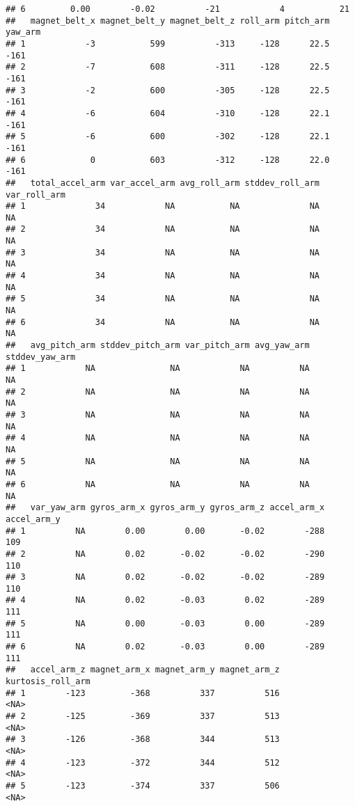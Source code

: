 \documentclass[
]{article}
\begin{document}
\begin{verbatim}
## 6         0.00        -0.02          -21            4           21
##   magnet_belt_x magnet_belt_y magnet_belt_z roll_arm pitch_arm yaw_arm
## 1            -3           599          -313     -128      22.5    -161
## 2            -7           608          -311     -128      22.5    -161
## 3            -2           600          -305     -128      22.5    -161
## 4            -6           604          -310     -128      22.1    -161
## 5            -6           600          -302     -128      22.1    -161
## 6             0           603          -312     -128      22.0    -161
##   total_accel_arm var_accel_arm avg_roll_arm stddev_roll_arm var_roll_arm
## 1              34            NA           NA              NA           NA
## 2              34            NA           NA              NA           NA
## 3              34            NA           NA              NA           NA
## 4              34            NA           NA              NA           NA
## 5              34            NA           NA              NA           NA
## 6              34            NA           NA              NA           NA
##   avg_pitch_arm stddev_pitch_arm var_pitch_arm avg_yaw_arm stddev_yaw_arm
## 1            NA               NA            NA          NA             NA
## 2            NA               NA            NA          NA             NA
## 3            NA               NA            NA          NA             NA
## 4            NA               NA            NA          NA             NA
## 5            NA               NA            NA          NA             NA
## 6            NA               NA            NA          NA             NA
##   var_yaw_arm gyros_arm_x gyros_arm_y gyros_arm_z accel_arm_x accel_arm_y
## 1          NA        0.00        0.00       -0.02        -288         109
## 2          NA        0.02       -0.02       -0.02        -290         110
## 3          NA        0.02       -0.02       -0.02        -289         110
## 4          NA        0.02       -0.03        0.02        -289         111
## 5          NA        0.00       -0.03        0.00        -289         111
## 6          NA        0.02       -0.03        0.00        -289         111
##   accel_arm_z magnet_arm_x magnet_arm_y magnet_arm_z kurtosis_roll_arm
## 1        -123         -368          337          516              <NA>
## 2        -125         -369          337          513              <NA>
## 3        -126         -368          344          513              <NA>
## 4        -123         -372          344          512              <NA>
## 5        -123         -374          337          506              <NA>

\end{verbatim}
\end{document}
